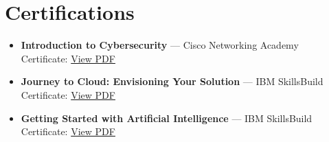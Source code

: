 \documentclass[letterpaper,11pt]{article}
\begin{document}
\section{Certifications}
  \begin{itemize}[leftmargin=0.15in, label={}]
    \item \textbf{Introduction to Cybersecurity} --- Cisco Networking Academy\\
    Certificate: \href{https://github.com/Ron41202/certifications/blob/995d03deba715d88af29c97352229ceed320ee50/certificates/Introduction_to_Cybersecurity_certificate_rohannegi688-gmail-com_209484cb-60af-4207-b921-43918b5cc77e.pdf}{View PDF}
    \item \textbf{Journey to Cloud: Envisioning Your Solution} --- IBM SkillsBuild\\
    Certificate: \href{https://github.com/Ron41202/certifications/blob/995d03deba715d88af29c97352229ceed320ee50/certificates/IBMDesign20250803-31-hqkzt.pdf}{View PDF}
    \item \textbf{Getting Started with Artificial Intelligence} --- IBM SkillsBuild\\
    Certificate: \href{https://github.com/Ron41202/certifications/blob/995d03deba715d88af29c97352229ceed320ee50/certificates/IBMDesign20250803-29-s06v8q.pdf}{View PDF}
  \end{itemize}

\end{document}
